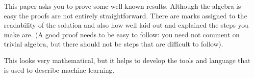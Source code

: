 \documentclass{sotonExamBoxes}    %
\begin{document}


\maketitle

This paper asks you to prove some well known results.  Although the
algebra is easy the proofs are not entirely straightforward.  There
are marks assigned to the readability of the solution and also how
well laid out and explained the steps you make are. (A good proof
needs to be easy to follow: you need not comment on trivial algebra,
but there should not be steps that are difficult to follow).

This looks very mathematical, but it helps to develop the tools and
language that is used to describe machine learning.




\end{document}
